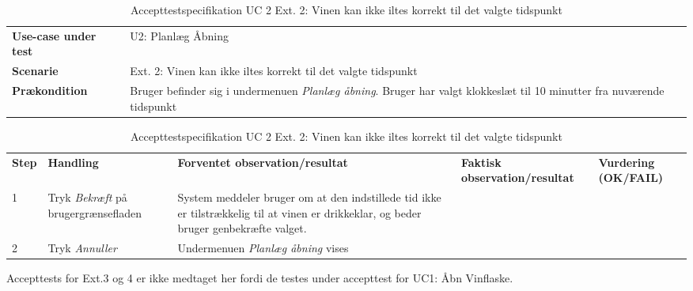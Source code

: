 \begin{table}[H]
	\centering
	\caption{Accepttestspecifikation UC 2 Ext. 2: Vinen kan ikke iltes korrekt til det valgte tidspunkt}
	\label{ATUC2:Ext2}
	\begin{tabular}{ p{80pt}  p{320pt} }\hline
		\rowcolor{lightgray}	
		\textbf{Use-case under test} & U2: Planlæg Åbning \\
		\rowcolor{white}
		\textbf{Scenarie} & Ext. 2: Vinen kan ikke iltes korrekt til det valgte tidspunkt \\\rowcolor{lightgray}	
		\textbf{Prækondition} &
		Bruger befinder sig i undermenuen \emph{Planlæg åbning}. Bruger har valgt klokkeslæt til 10 minutter fra nuværende tidspunkt \\
		\hline
	\end{tabular}
	\begin{tabular}{  p{26pt} p{100pt}  p{101pt} | p{67pt} | p{68pt}}
		\textbf{Step} & \textbf{Handling} & \textbf{Forventet observation/resultat} & \textbf{Faktisk observation/resultat} & \textbf{Vurdering (OK/FAIL)}\\
		1 & Tryk \emph{Bekræft} på brugergrænsefladen & System meddeler bruger om at den indstillede tid ikke er tilstrækkelig til at vinen er drikkeklar, og beder bruger genbekræfte valget.
 &  &  \\
 		2 & Tryk \emph{Annuller} & Undermenuen \emph{Planlæg åbning} vises\\
		\hline
	\end{tabular}
\end{table}

Accepttests for Ext.3 og 4 er ikke medtaget her fordi de testes under accepttest for UC1: Åbn Vinflaske.

